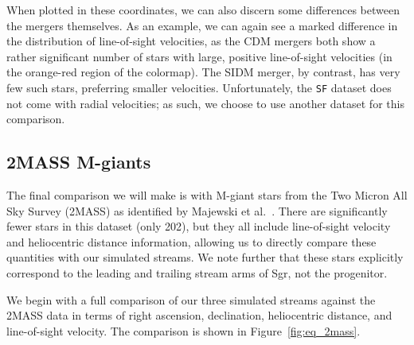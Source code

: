 When plotted in these coordinates, we can also discern some differences between
the mergers themselves. As an example, we can again see a marked difference in
the distribution of line-of-sight velocities, as the CDM mergers both show a
rather significant number of stars with large, positive line-of-sight
velocities (in the orange-red region of the colormap). The SIDM merger, by
contrast, has very few such stars, preferring smaller velocities. Unfortunately,
the \verb|SF| dataset does not come with radial velocities; as such, we choose
to use another dataset for this comparison.


\hypertarget{twomass}{%
\subsection{2MASS M-giants}\label{twomass}}

The final comparison we will make is with M-giant stars from the Two Micron All
Sky Survey (2MASS) as identified by Majewski et al.~\cite{majewski_two_2003}.
There are significantly fewer stars in this dataset (only 202), but they all
include line-of-sight velocity and heliocentric distance information, allowing
us to directly compare these quantities with our simulated streams. We note
further that these stars explicitly correspond to the leading and trailing
stream arms of Sgr, not the progenitor.

We begin with a full comparison of our three simulated streams against the 2MASS
data in terms of right ascension, declination, heliocentric distance, and
line-of-sight velocity. The comparison is shown in Figure~\ref{fig:eq_2mass}. 

